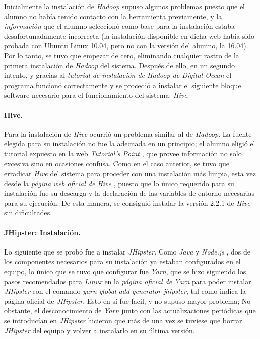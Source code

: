 \par
Inicialmente la instalación de \textit{Hadoop} supuso algunos problemas puesto que el alumno no había tenido contacto con la herramienta previamente, y la \textit{información} \cite{hadoop_installation_bad} que el alumno seleccionó como base para la instalación estaba desafortunadamente incorrecta (la instalación disponible en dicha web había sido probada con Ubuntu Linux 10.04, pero no con la versión del alumno, la 16.04). Por lo tanto, se tuvo que empezar de cero, eliminando cualquier rastro de la primera instalación de \textit{Hadoop} del sistema. Después de ello, en un segundo intento, y gracias al \textit{tutorial de instalación de Hadoop de Digital Ocean} \cite{hadoop_installation} el programa funcionó correctamente y se procedió a instalar el siguiente bloque software necesario para el funcionamiento del sistema: \textit{Hive}.

\bigskip
\par
\paragraph*{Hive.}

\par
Para la instalación de \textit{Hive} ocurrió un problema similar al de \textit{Hadoop}. La fuente elegida para su instalación no fue la adecuada en un principio; el alumno eligió el tutorial expuesto en la web \textit{Tutorial's Point} \cite{hivetutorialspoint}, que provee información no solo excesiva sino en ocasiones confusa. Como en el caso anterior, se tuvo que erradicar \textit{Hive} del sistema para proceder con una instalación más limpia, esta vez desde la \textit{página web oficial de Hive} \cite{hive_installation}, puesto que lo único requerido para su instalación fue su descarga y la declaración de las variables de entorno necesarias para su ejecución. De esta manera, se consiguió instalar la versión 2.2.1 de \textit{Hive} sin dificultades. 

\bigskip
\par
\paragraph*{JHipster: Instalación.}

\par
Lo siguiente que se probó fue a instalar \textit{JHipster}. Como \textit{Java} y \textit{Node.js} \cite{nodejs}, dos de los componentes necesarios para su instalación ya estaban configurados en el equipo, lo único que se tuvo que configurar fue \textit{Yarn}, que se hizo siguiendo los pasos recomendados para \textit{Linux} en la \textit{página oficial de Yarn} \cite{yarninstall} para poder instalar \textit{JHipster} con el comando \textit{yarn global add generator-jhipster}, tal como indica la página oficial de \textit{JHipster}. Esto en sí fue facil, y no supuso mayor problema; No obstante, el desconocimiento de \textit{Yarn} junto con las actualizaciones periódicas que se introducían en \textit{JHipster} hicieron que más de una vez se tuviese que borrar \textit{JHipster} del equipo y volver a instalarlo en su última versión.  

